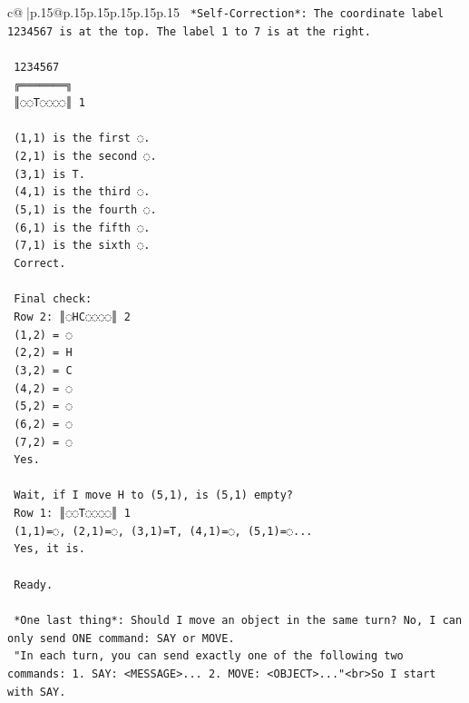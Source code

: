 \documentclass{article}
\begin{document}
{\begin{supertabular}{c@{$\;$}|p{.15\linewidth}@{}p{.15\linewidth}p{.15\linewidth}p{.15\linewidth}p{.15\linewidth}p{.15\linewidth}}
{{{\texttt{    *Self{-}Correction*: The coordinate label 1234567 is at the top. The label 1 to 7 is at the right.} \\
\\ 
\texttt{     1234567} \\
\texttt{    ╔═══════╗} \\
\texttt{    ║◌◌T◌◌◌◌║ 1} \\
\\ 
\texttt{    (1,1) is the first ◌.} \\
\texttt{    (2,1) is the second ◌.} \\
\texttt{    (3,1) is T.} \\
\texttt{    (4,1) is the third ◌.} \\
\texttt{    (5,1) is the fourth ◌.} \\
\texttt{    (6,1) is the fifth ◌.} \\
\texttt{    (7,1) is the sixth ◌.} \\
\texttt{    Correct.} \\
\\ 
\texttt{    Final check:} \\
\texttt{    Row 2: ║◌HC◌◌◌◌║ 2} \\
\texttt{    (1,2) = ◌} \\
\texttt{    (2,2) = H} \\
\texttt{    (3,2) = C} \\
\texttt{    (4,2) = ◌} \\
\texttt{    (5,2) = ◌} \\
\texttt{    (6,2) = ◌} \\
\texttt{    (7,2) = ◌} \\
\texttt{    Yes.} \\
\\ 
\texttt{    Wait, if I move H to (5,1), is (5,1) empty?} \\
\texttt{    Row 1: ║◌◌T◌◌◌◌║ 1} \\
\texttt{    (1,1)=◌, (2,1)=◌, (3,1)=T, (4,1)=◌, (5,1)=◌...} \\
\texttt{    Yes, it is.} \\
\\ 
\texttt{    Ready.} \\
\\ 
\texttt{    *One last thing*: Should I move an object in the same turn? No, I can only send ONE command: SAY or MOVE.} \\
\texttt{    "In each turn, you can send exactly one of the following two commands: 1. SAY: <MESSAGE>... 2. MOVE: <OBJECT>..."<br>So I start with SAY.} \\
}}}
\end{supertabular}}
\end{document}

